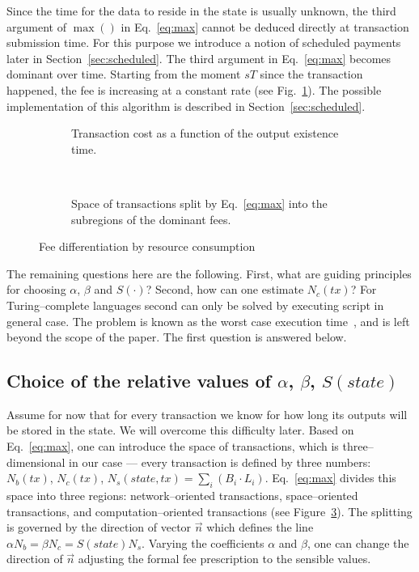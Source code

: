 \documentclass[]{llncs}   %
\begin{document}
Since the time for the data to reside in the state is usually unknown,
the third argument of $\max()$ in Eq.~\eqref{eq:max} cannot be deduced directly at
transaction submission time. For this purpose we introduce a notion of 
scheduled payments later in Section~\ref{sec:scheduled}. The third
argument in Eq.~\eqref{eq:max} becomes dominant over time. Starting from the
moment $sT$ since the transaction happened, the
fee is increasing at a constant rate (see Fig.~\ref{fig:max_t}). The possible implementation of this 
algorithm is described in Section~\ref{sec:scheduled}.
\begin{figure}[h]
    \centering
    \begin{subfigure}[b]{.45\textwidth}
    
    \caption{Transaction cost as a function of the output existence time.
        \newline
        \label{fig:max_t}}
    \end{subfigure}
    ~
    \begin{subfigure}[b]{.45\textwidth}
        
        \caption{Space of transactions split by
            Eq.~\eqref{eq:max} into the subregions of the dominant fees.
            \label{fig:max}}
        \end{subfigure}
        \caption{Fee differentiation by resource consumption}
\end{figure}

The remaining questions here are the following. First, what are guiding principles for
choosing $\alpha$, $\beta$ and $S(\cdot)$? Second, how can one estimate $N_c(tx)$?
For Turing--complete languages second can only be solved by executing
script in general case. The problem is known as the worst case execution
time~\cite{Wilhelm2008}, and is left beyond the scope of the paper. The
first question is answered below.

\subsection{Choice of the relative values of $\alpha$, $\beta$, $S(state)$}

Assume for now that for every transaction we know for how long its outputs will
be stored in the state. We will overcome this difficulty later. Based on
Eq.~\eqref{eq:max}, one can introduce the space of transactions, which is
three--dimensional in our case --- every transaction is defined by three
numbers: $N_b(tx)$, $N_c(tx)$, $N_s(state,tx) = \sum_i (B_i \cdot L_i)$.
Eq.~\eqref{eq:max} divides this space into three regions: network--oriented
transactions, space--oriented transactions, and computation--oriented
transactions (see Figure~\ref{fig:max}). The splitting is governed by the
direction of vector $\vec{n}$ which defines the line $\alpha N_b=\beta
N_c=S(state)N_s$.  Varying the coefficients $\alpha$ and $\beta$, one can change
the direction of $\vec{n}$ adjusting the formal fee prescription to the sensible
values.
\end{document}
